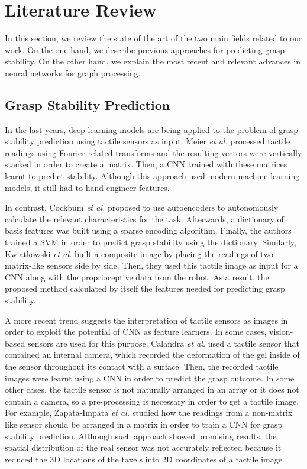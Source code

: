 \section{Literature Review}
\label{cha:tactile:sec:relatedworks}

In this section, we review the state of the art of the two main fields related to our work. On the one hand, we describe previous approaches for predicting grasp stability. On the other hand, we explain the most recent and relevant advances in neural networks for graph processing.

\subsection{Grasp Stability Prediction}
\label{cha:tactile:sec:relatedworks:subsec:grasp-stability-prediction}

In the last years, deep learning models are being applied to the problem of grasp stability prediction using tactile sensors as input. Meier \emph{et al.} \cite{Meier2016a} processed tactile readings using Fourier-related transforms and the resulting vectors were vertically stacked in order to create a matrix. Then, a \ac{CNN} trained with these matrices learnt to predict stability. Although this approach used modern machine learning models, it still had to hand-engineer features.

In contrast, Cockbum \emph{et al.} \cite{Cockbum2017} proposed to use autoencoders to autonomously calculate the relevant characteristics for the task. Afterwards, a dictionary of basis features was built using a sparse encoding algorithm. Finally, the authors trained a \ac{SVM} in order to predict grasp stability using the dictionary. Similarly, Kwiatkowski \emph{et al.} \cite{Kwiatkowski2017} built a composite image by placing the readings of two matrix-like sensors side by side. Then, they used this tactile image as input for a \ac{CNN} along with the proprioceptive data from the robot. As a result, the proposed method calculated by itself the features needed for predicting grasp stability.

A more recent trend suggests the interpretation of tactile sensors as images in order to exploit the potential of \ac{CNN} as feature learners. In some cases, vision-based sensors are used for this purpose. Calandra \emph{et al.} \cite{Calandra2017} used a tactile sensor that contained an internal camera, which recorded the deformation of the gel inside of the sensor throughout its contact with a surface. Then, the recorded tactile images were learnt using a \ac{CNN} in order to predict the grasp outcome. In some other cases, the tactile sensor is not naturally arranged in an array or it does not contain a camera, so a pre-processing is necessary in order to get a tactile image. For example, Zapata-Impata \emph{et al.} \cite{Zapata2018} studied how the readings from a non-matrix like sensor should be arranged in a matrix in order to train a \ac{CNN} for grasp stability prediction. Although such approach showed promising results, the spatial distribution of the real sensor was not accurately reflected because it reduced the \acs{3D} locations of the taxels into \acs{2D} coordinates of a tactile image.

